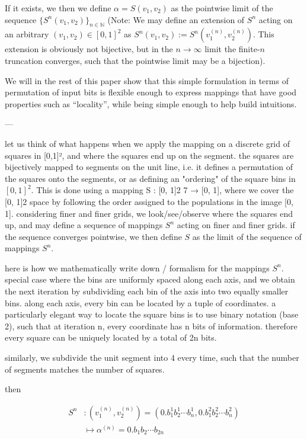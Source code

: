 \documentclass[NETN,manuscript]{stjour-new}
\begin{document}
If it exists, we then we define $\alpha = S(v_1, v_2)$ as the pointwise limit of the sequence $\{S^n(v_1, v_2)\}_{n \in \mathbb N}$ (Note: We may define an extension of $S^n$ acting on an arbitrary $(v_1, v_2) \in [0,1]^2$ as $S^n(v_1, v_2) := S^n(v_1^{(n)}, v_2^{(n)})$. This extension is obviously not bijective, but in the $n \to \infty$ limit the finite-$n$ truncation converges, such that the pointwise limit may be a bijection).

We will in the rest of this paper show that this simple formulation in terms of permutation of input bits is flexible enough to express mappings that have good properties such as ``locality'', while being simple enough to help build intuitions.



---

let us think of what happens when we apply the mapping on a discrete grid of squares in [0,1]², and where the squares end up on the segment.
the squares are bijectively mapped to segments on the unit line, i.e. it defines a permutation of the squares onto the segments, or as defining an "ordering" of the square bins in $[0,1]^2$. This is done using a mapping S : [0, 1]2 7 → [0, 1],
where we cover the [0, 1]2 space by following the order assigned to the populations in
the image [0, 1].
considering finer and finer grids, we look/see/observe where the squares end up, and may define a sequence of mappings $S^n$ acting on finer and finer grids.
if the sequence converges pointwise, we then define $S$ as the limit of the sequence of mappings $S^n$.


here is how we mathematically write down / formalism for the mappings $S^n$.
special case where the bins are uniformly spaced along each axis, and we obtain the next iteration by subdividing each bin of the axis into two equally smaller bins.
along each axis, every bin can be located by a tuple of coordinates. a particularly elegant way to locate the square bins is to use binary notation (base 2), such that at iteration n, every coordinate has n bits of information. therefore every square can be uniquely located by a total of 2n bits.

similarly, we subdivide the unit segment into 4 every time, such that the number of segments matches the number of squares.

then

\begin{equation} \begin{aligned}
S^n &: (v_1^{(n)}, v_2^{(n)}) = (0.b_1^1 b_2^1 \cdots b_n^1, 0.b_1^2 b_2^2 \cdots b_n^2) \\
&\mapsto \alpha^{(n)} = 0.b_1 b_2 \cdots b_{2n}
\end{aligned} \end{equation}
\end{document}
